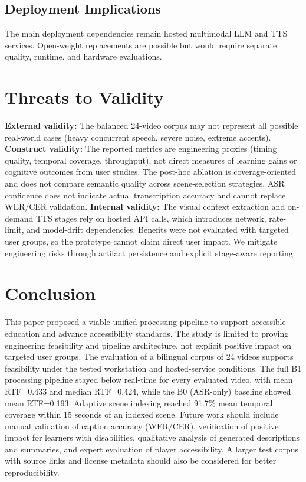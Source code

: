 \documentclass[conference]{IEEEtran}
\begin{document}
\subsection{Deployment Implications}
The main deployment dependencies remain hosted multimodal LLM and TTS services. Open-weight replacements are possible but would require separate quality, runtime, and hardware evaluations.

\section{Threats to Validity}
\textbf{External validity:} The balanced 24-video corpus may not represent all possible real-world cases (heavy concurrent speech, severe noise, extreme accents). \textbf{Construct validity:} The reported metrics are engineering proxies (timing quality, temporal coverage, throughput), not direct measures of learning gains or cognitive outcomes from user studies. The post-hoc ablation is coverage-oriented and does not compare semantic quality across scene-selection strategies. ASR confidence does not indicate actual transcription accuracy and cannot replace WER/CER validation. \textbf{Internal validity:} The visual context extraction and on-demand TTS stages rely on hosted API calls, which introduces network, rate-limit, and model-drift dependencies. Benefits were not evaluated with targeted user groups, so the prototype cannot claim direct user impact. We mitigate engineering risks through artifact persistence and explicit stage-aware reporting.

\section{Conclusion}
This paper proposed a viable unified processing pipeline to support accessible education and advance accessibility standards. The study is limited to proving engineering feasibility and pipeline architecture, not explicit positive impact on targeted user groups. The evaluation of a bilingual corpus of 24 videos supports feasibility under the tested workstation and hosted-service conditions. The full B1 processing pipeline stayed below real-time for every evaluated video, with mean RTF=0.433 and median RTF=0.424, while the B0 (ASR-only) baseline showed mean RTF=0.193. Adaptive scene indexing reached 91.7\% mean temporal coverage within 15 seconds of an indexed scene.
Future work should include manual validation of caption accuracy (WER/CER), verification of positive impact for learners with disabilities, qualitative analysis of generated descriptions and summaries, and expert evaluation of player accessibility. A larger test corpus with source links and license metadata should also be considered for better reproducibility.



\end{document}
